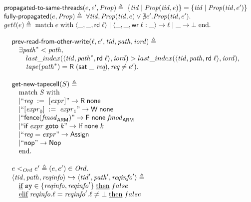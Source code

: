 {\[
\begin{array}{l}
\textup{\sf propagated-to-same-threads}(e, e', \mathit{Prop}) \triangleq \;
\{ \mathit{tid} \mid \mathit{Prop}(\mathit{tid}, e) \} = \{ \mathit{tid} \mid \mathit{Prop}(\mathit{tid}, e') \} \\
\textup{\sf fully-propagated}(e, \mathit{Prop}) \triangleq \;
\forall \mathit{tid}, \mathit{Prop}(\mathit{tid}, e) \lor \nexists e'. \mathit{Prop}(\mathit{tid}, e'). \\
get\ell(e) \triangleq
\; \text{match} \; e \; \text{with}
\;   \langle \_,  \_, {\sf rd} \; \ell \rangle
\mid \langle \_,  \_, {\sf wr} \; \ell:\_ \rangle -> \ell
\mid \_ -> \bot
\; \text{end}. \\
\end{array}
\]

\[
\begin{array}{l}
\textup{\sf prev-read-from-other-write}(\ell, e', \mathit{tid}, \mathit{path}, \mathit{iord}) \triangleq \\
\quad \exists \mathit{path}^{*} < \mathit{path}, \\
\quad \quad last\_index(\langle \mathit{tid},  \mathit{path}^{*}, {\sf rd} \; \ell \rangle, \mathit{iord}) > last\_index(\langle \mathit{tid},  \mathit{path}, {\sf rd} \; \ell \rangle, \mathit{iord}), \\
\quad \quad \mathit{tape}(\mathit{path}^{*}) = \textsf{R} \; (\mathsf{sat} \; \_ \; \textit{req}), \textit{req} \not = e'). \\
\\
\textup{\sf get-new-tapecell}(S) \triangleq \\
\quad \text{match} \; S \; \text{with} \\
\quad | ``\mathit{reg} \;:=_{}\;[\mathit{expr}]" -> \textsf{R} \; \mathsf{none} \\
\quad | ``[\mathit{expr}_0]\;:=\;\mathit{expr}_1" -> \textsf{W} \; \mathsf{none} \\
\quad | ``\mathsf{fence}({\mathit{fmod}_{\mathsf{ARM}}})" -> \textsf{F} \; \mathsf{none} \; \mathit{fmod}_{\mathsf{ARM}} \\
\quad | ``\textsf{if} \; \mathit{expr} \; \textsf{goto} \; \mathit{k}" -> \textsf{If} \; \mathsf{none} \; \mathit{k} \\
\quad | ``\mathit{reg} = \mathit{expr}" -> \textsf{Assign} \\
\quad | ``\textsf{nop}" -> \textsf{Nop} \\
\quad \text{end}. \\
\\
e <_{\mathit{Ord}} e' \triangleq (e, e') \in \mathit{Ord}. \\
\langle \mathit{tid},  \mathit{path},  \mathit{reqinfo} \rangle \hookrightarrow \langle \mathit{tid}',  \mathit{path}',  \mathit{reqinfo}' \rangle \triangleq \\
\quad \text{\underline{if}} \; \mathtt{sy} \in \{\mathit{reqinfo},\mathit{reqinfo}'\} \; \text{\underline{then}} \; false \\
\quad \text{\underline{elif}} \; \mathit{reqinfo}.\ell = \mathit{reqinfo}'.\ell \not = \bot \; \text{\underline{then}} \; false \\

\end{array}\]}
